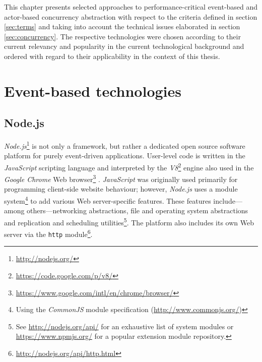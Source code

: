 This chapter presents selected approaches to performance-critical event-based and actor-based concurrency abstraction with respect to the criteria defined in section \ref{sec:terms} and taking into account the technical issues elaborated in section \ref{sec:concurrency}. The respective technologies were chosen according to their current relevancy and popularity in the current technological background and ordered with regard to their applicability in the context of this thesis.

\section{Event-based technologies}
\label{sec:evnt}

\subsection{Node.js}
\label{sec:nodejs}

\textit{Node.js}\footnote{\url{http://nodejs.org/}} is not only a framework, but rather a dedicated open source software platform for purely event-driven applications. User-level code is written in the \textit{JavaScript} scripting language and interpreted by the \textit{V8}\footnote{\url{https://code.google.com/p/v8/}} engine also used in the \textit{Google Chrome} Web browser\footnote{\url{https://www.google.com/intl/en/chrome/browser/}} \cite[p. 19]{Hughes-Croucher2012}. \textit{JavaScript} was originally used primarily for programming client-side website behaviour; however, \textit{Node.js} uses a module system\footnote{Using the \textit{CommonJS} module specification (\url{http://www.commonjs.org/})} to add various Web server-specific features. These features include---among others---networking abstractions, file and operating system abstractions and replication and scheduling utilities\footnote{See \url{http://nodejs.org/api/} for an exhaustive list of system modules or \url{https://www.npmjs.org/} for a popular extension module repository.}. The platform also includes its own Web server via the \texttt{http} module\footnote{\url{http://nodejs.org/api/http.html}}.

